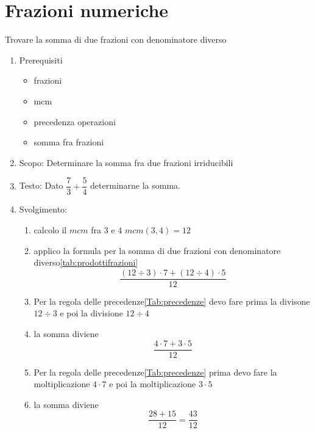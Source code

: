 
\section{Frazioni numeriche}
\label{sec:Frazioninumeriche}
\begin{table}[H]
	\caption{Trovare la somma di due frazioni con denominatore diverso}
	\label{tab:Trovaresommaduefrazionidenominatorediverso1}
\begin{enumerate}
	\item Prerequisiti 
\begin{itemize}
	\item frazioni
	\item mcm
	 \item precedenza operazioni
 \item somma fra frazioni
\end{itemize}
  \item Scopo: Determinare la somma fra due frazioni irriducibili
  \item Testo: Dato $\dfrac{7}{3}+\dfrac{5}{4}$  determinarne la somma.
  \item Svolgimento: 
  \begin{enumerate}
  \item calcolo il $mcm$ fra $3$ e $4$ $mcm(3,4)=12$
	\item applico la formula per la somma di due frazioni con denominatore diverso\nobs\vref{tab:prodottifrazioni} \[\dfrac{(12\div 3)\cdot 7+(12\div 4)\cdot 5}{12}\]
	\item Per la regola delle precedenze\nobs\vref{Tab:precedenze} devo fare prima la divisone $12\div 3$ e poi la divisione $12\div 4$
	\item la somma diviene \[\dfrac{4\cdot 7+3\cdot 5}{12}\]
	\item Per la regola delle precedenze\nobs\vref{Tab:precedenze} prima devo fare la moltiplicazione $4\cdot 7$ e poi la moltiplicazione $3\cdot 5$
	\item la somma diviene \[\dfrac{28+15}{12}=\dfrac{43}{12}\]
\end{enumerate}
  \end{enumerate}
\end{table}
